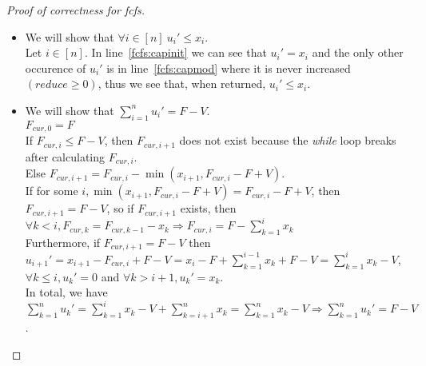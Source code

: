 \begin{proof}[Proof of correctness for fcfs] \
   \begin{itemize}
      \item We will show that $\forall i \in [n] \: u_i' \leq x_i$. \\
      Let $i \in [n]$. In line~\ref{fcfs:capinit} we can see that $u_i' = x_i$ and the only other occurence of $u_i'$
      is in line~\ref{fcfs:capmod} where it is never increased $(reduce \geq 0)$, thus we see that, when returned,
      $u_i' \leq x_i$.
      \item We will show that $\sum\limits_{i=1}^{n}u_i' = F - V$. \\
      $F_{cur,0} = F$ \\
      If $F_{cur,i} \leq F - V$, then $F_{cur,i+1}$ does not exist because the \emph{while} loop breaks after calculating
      $F_{cur,i}$. \\
      Else $F_{cur,i+1} = F_{cur,i} - \min{(x_{i+1}, F_{cur,i} - F + V)}$. \\
      If for some $i, \min{(x_{i+1}, F_{cur,i} - F + V)} = F_{cur,i} - F + V$, then $F_{cur,i+1} = F - V$, so if
      $F_{cur,i+1}$ exists, then $\forall k < i, F_{cur,k} = F_{cur,k-1} - x_k \Rightarrow F_{cur,i} =
      F - \sum\limits_{k=1}^{i}x_k$ \\
      Furthermore, if $F_{cur,i+1} = F - V$ then $u_{i+1}' = x_{i+1} - F_{cur,i} + F - V =
      x_i - F + \sum\limits_{k=1}^{i-1}x_k + F - V = \sum\limits_{k=1}^{i}x_k - V$, $\forall k \leq i, u_k' = 0$
      and $\forall k > i+1, u_k' = x_k$. \\
      In total, we have $\sum\limits_{k=1}^{n}u_k' = \sum\limits_{k=1}^{i}x_k - V + \sum\limits_{k=i+1}^{n}x_k =
      \sum\limits_{k=1}^{n}x_k - V \Rightarrow \sum\limits_{k=1}^{n}u_k' = F - V$.
   \end{itemize}
\end{proof}
